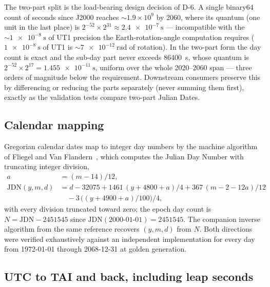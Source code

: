 The two-part split is the load-bearing design decision of D-6. A single
binary64 count of seconds since J2000 reaches $\sim\!1.9\times10^{9}$ by
2060, where its quantum (one unit in the last place) is
$2^{-52}\times 2^{31} \approx \qty{2.4e-7}{\second}$ --- incompatible with
the $\sim\!\qty{1e-8}{\second}$ of UT1 precision the Earth-rotation-angle
computation requires ($\qty{1e-8}{\second}$ of UT1 is
$\sim\!\qty{7e-12}{\radian}$ of rotation). In the two-part form the day
count is exact and the sub-day part never exceeds \qty{86400}{\second},
whose quantum is $2^{-52} \times 2^{17} = \qty{1.455e-11}{\second}$,
uniform over the whole 2020--2060 span --- three orders of magnitude below
the requirement. Downstream consumers preserve this by differencing or
reducing the parts separately (never summing them first), exactly as the
validation tests compare two-part Julian Dates.

\subsection{Calendar mapping}

Gregorian calendar dates map to integer day numbers by the machine
algorithm of Fliegel and Van Flandern~\cite{fliegel1968}, which computes
the Julian Day Number with truncating integer division,
\begin{equation}
  \begin{aligned}
    a &= \left(m - 14\right)/12,\\
    \mathrm{JDN}(y, m, d) &= d - 32075
      + 1461\,(y + 4800 + a)/4
      + 367\,(m - 2 - 12a)/12\\
      &\quad - 3\,\bigl((y + 4900 + a)/100\bigr)/4,
  \end{aligned}
  \label{eq:time:fvf}
\end{equation}
with every division truncated toward zero; the epoch day count is
$N = \mathrm{JDN} - 2451545$ since $\mathrm{JDN}(\text{2000-01-01}) =
2451545$. The companion inverse algorithm from the same reference recovers
$(y, m, d)$ from $N$. Both directions were verified exhaustively against an
independent implementation for every day from 1972-01-01 through 2068-12-31
at golden generation.

\subsection{UTC to TAI and back, including leap seconds}

